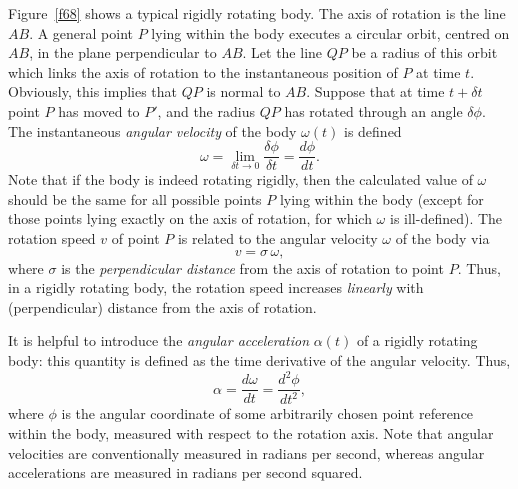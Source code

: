 Figure~\ref{f68} shows a typical rigidly 
rotating body. The axis of rotation is the line $AB$. A general point
$P$ lying within the body executes a circular orbit, centred on $AB$, in the plane perpendicular to
$AB$. Let the line $QP$ be a radius of this orbit which links the axis of rotation to the
instantaneous position of  $P$ at time $t$. Obviously, this implies that $QP$ is normal
to $AB$. Suppose that at time $t+\delta t$ point $P$ has moved to $P'$, and the radius
$QP$ has rotated through an angle $\delta\phi$. The instantaneous
{\em angular velocity}  of the body $\omega(t)$ is defined
\begin{equation}
\omega = \lim_{\delta t\rightarrow 0}\frac{\delta\phi}{\delta t}=\frac{d\phi}{dt}.
\end{equation}
Note that if the body is indeed rotating rigidly, then the calculated value of $\omega$ should
be the same for all possible points $P$ lying within the body (except for those points lying
exactly on the axis of rotation, for which $\omega$ is ill-defined). 
The rotation speed $v$ of point $P$ is related to the angular velocity $\omega$
of the body via
\begin{equation}
v = \sigma\,\omega,
\end{equation}
where $\sigma$ is the {\em perpendicular distance}  from the axis of rotation to
point $P$. Thus,
in a rigidly rotating body, the rotation speed increases {\em linearly} with (perpendicular) distance
from the axis of rotation.

It is helpful to introduce the {\em angular acceleration} $\alpha(t)$ of a rigidly rotating body:
this quantity is defined as the 
time derivative of the angular velocity. Thus,
\begin{equation}
\alpha  = \frac{d\omega}{dt}= \frac{d^2\phi}{dt^2},
\end{equation}
where $\phi$ is the angular coordinate of some arbitrarily chosen point reference
within the body, measured
with respect to the rotation axis.
Note that angular velocities are conventionally measured in radians per second, whereas angular
accelerations are measured in radians per second squared.
 
